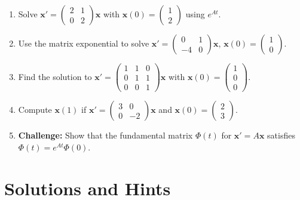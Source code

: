\documentclass[12pt]{article}
\begin{document}
\begin{enumerate}[start=26]
\item Solve $\mathbf{x}' = \begin{pmatrix} 2 & 1 \\ 0 & 2 \end{pmatrix}\mathbf{x}$ with $\mathbf{x}(0) = \begin{pmatrix} 1 \\ 2 \end{pmatrix}$ using $e^{At}$.

\item Use the matrix exponential to solve $\mathbf{x}' = \begin{pmatrix} 0 & 1 \\ -4 & 0 \end{pmatrix}\mathbf{x}$, $\mathbf{x}(0) = \begin{pmatrix} 1 \\ 0 \end{pmatrix}$.

\item Find the solution to $\mathbf{x}' = \begin{pmatrix} 1 & 1 & 0 \\ 0 & 1 & 1 \\ 0 & 0 & 1 \end{pmatrix}\mathbf{x}$ with $\mathbf{x}(0) = \begin{pmatrix} 1 \\ 0 \\ 0 \end{pmatrix}$.

\item Compute $\mathbf{x}(1)$ if $\mathbf{x}' = \begin{pmatrix} 3 & 0 \\ 0 & -2 \end{pmatrix}\mathbf{x}$ and $\mathbf{x}(0) = \begin{pmatrix} 2 \\ 3 \end{pmatrix}$.

\item \textbf{Challenge:} Show that the fundamental matrix $\Phi(t)$ for $\mathbf{x}' = A\mathbf{x}$ satisfies $\Phi(t) = e^{At}\Phi(0)$.
\end{enumerate}

\section*{Solutions and Hints}
\end{document}
